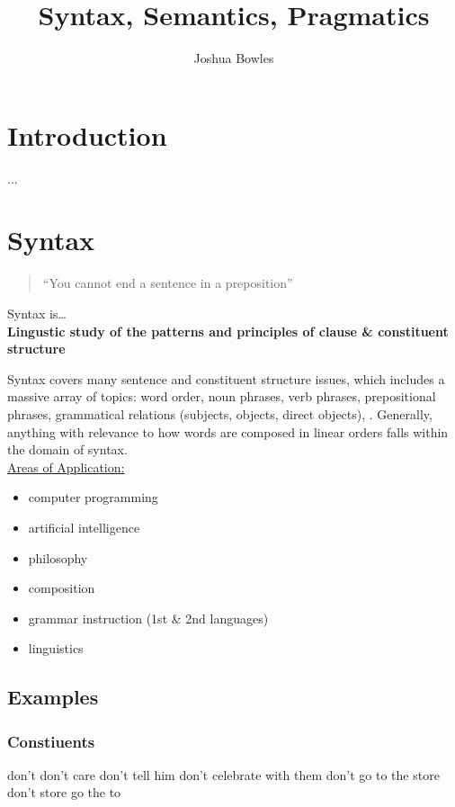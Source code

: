 \documentclass{article}
\begin{document}

\title{Syntax, Semantics, Pragmatics}
\author{Joshua Bowles}
\maketitle
\section{Introduction}
...
\section{Syntax}
\begin{quote}
``You cannot end a sentence in a preposition''
\end{quote}
\begin{center}
Syntax is\ldots \\
{\bf Lingustic study of the patterns and principles of clause \& constituent structure}
\end{center}

Syntax covers many sentence and constituent structure issues, which includes a massive array of topics: word order, noun phrases, verb phrases, prepositional phrases, grammatical relations (subjects, objects, direct objects),  . Generally, anything with relevance to how words are composed in linear orders falls within the domain of syntax.
\\

\underline{Areas of Application:} 
\begin{itemize}
\item computer programming
\item artificial intelligence
\item philosophy
\item composition
\item grammar instruction (1st \& 2nd languages)
\item linguistics
\end{itemize}

\subsection{Examples}

\subsubsection{Constiuents}
\pex \a don't
\a don't care
\a don't tell him
\a don't celebrate with them
\a don't go to the store
\a don't store go the to
\xe
\end{document}
